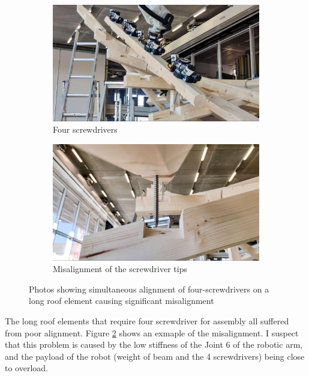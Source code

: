 \begin{figure}[!h]
    \centering
    \begin{subfigure}[b]{0.49\textwidth}
        \centering
        \includegraphics[width=\textwidth]{images/7b/img83.jpg}
        \caption{Four screwdrivers}
        \label{fig:simultaneous-alignment-of-four-screwdriver-tips}
    \end{subfigure}
    \hfill
    \begin{subfigure}[b]{0.49\textwidth}
        \centering
        \includegraphics[width=\textwidth]{images/7b/img84.jpg}
        \caption{Misalignment of the screwdriver tips}
    \end{subfigure}
    \caption{Photos showing simultaneous alignment of four-screwdrivers on a long roof element causing significant misalignment}
    \label{fig:photo-misalignment-of-four-screwdriver-tips}
\end{figure}

The long roof elements that require four screwdriver for assembly all suffered from poor alignment. Figure \ref{fig:photo-misalignment-of-four-screwdriver-tips} shows an exmaple of the misalignment. I suspect that this problem is caused by the low stiffness of the Joint 6 of the robotic arm, and the payload of the robot (weight of beam and the 4 screwdrivers) being close to overload. 

